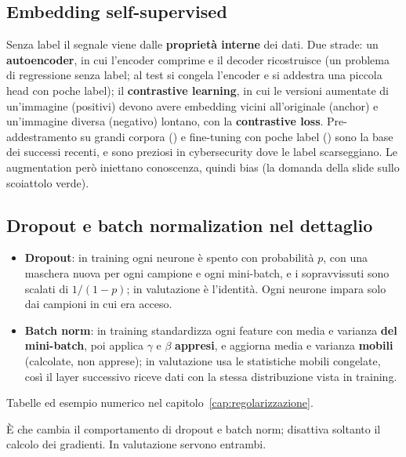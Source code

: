 \subsection{Embedding self-supervised}
Senza label il segnale viene dalle \textbf{proprietà interne} dei dati. Due strade: un
\textbf{autoencoder}, in cui l'encoder comprime e il decoder ricostruisce (un problema di regressione senza
label; al test si congela l'encoder e si addestra una piccola head con poche label); il
\textbf{contrastive learning}, in cui le versioni aumentate di un'immagine (positivi) devono avere embedding
vicini all'originale (anchor) e un'immagine diversa (negativo) lontano, con la \textbf{contrastive loss}.
Pre-addestramento su grandi corpora () e fine-tuning con poche label () sono la
base dei successi recenti, e sono preziosi in cybersecurity dove le label scarseggiano. Le augmentation
però iniettano conoscenza, quindi bias (la domanda della slide sullo scoiattolo verde).

\subsection{Dropout e batch normalization nel dettaglio}
\begin{itemize}
  \item \textbf{Dropout}: in training ogni neurone è spento con probabilità $p$, con una maschera nuova per
    ogni campione e ogni mini-batch, e i sopravvissuti sono scalati di $1/(1-p)$; in valutazione è
    l'identità. Ogni neurone impara solo dai campioni in cui era acceso.
  \item \textbf{Batch norm}: in training standardizza ogni feature con media e varianza \textbf{del
    mini-batch}, poi applica $\gamma$ e $\beta$ \textbf{appresi}, e aggiorna media e varianza
    \textbf{mobili} (calcolate, non apprese); in valutazione usa le statistiche mobili congelate, così il
    layer successivo riceve dati con la stessa distribuzione vista in training.
\end{itemize}
Tabelle ed esempio numerico nel capitolo~\ref{cap:regolarizzazione}.

\begin{integrazione}
È  che cambia il comportamento di dropout e batch norm; 
disattiva soltanto il calcolo dei gradienti. In valutazione servono entrambi.
\end{integrazione}

